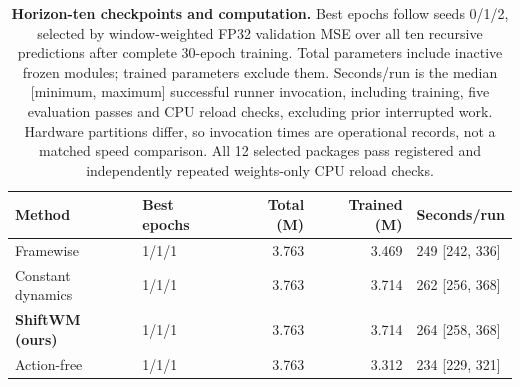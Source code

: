 \begin{table}[p]\centering\footnotesize
\setlength{\tabcolsep}{3pt}\renewcommand{\arraystretch}{1.13}
\begin{tabular}{llrrl}\toprule
Method & Best epochs & Total (M) & Trained (M) & Seconds/run\\\midrule
Framewise & 1/1/1 & 3.763 & 3.469 & 249 [242, 336]\\
Constant dynamics & 1/1/1 & 3.763 & 3.714 & 262 [256, 368]\\
\rowcolor{orange!9}
\textbf{ShiftWM (ours)} & 1/1/1 & 3.763 & 3.714 & 264 [258, 368]\\
Action-free & 1/1/1 & 3.763 & 3.312 & 234 [229, 321]\\
\bottomrule\end{tabular}
\caption{\textbf{Horizon-ten checkpoints and computation.} Best epochs follow seeds 0/1/2, selected by window-weighted FP32 validation MSE over all ten recursive predictions after complete 30-epoch training. Total parameters include inactive frozen modules; trained parameters exclude them. Seconds/run is the median [minimum, maximum] successful runner invocation, including training, five evaluation passes and CPU reload checks, excluding prior interrupted work. Hardware partitions differ, so invocation times are operational records, not a matched speed comparison. All 12 selected packages pass registered and independently repeated weights-only CPU reload checks.}
\label{tab:h10-checkpoints}\end{table}
